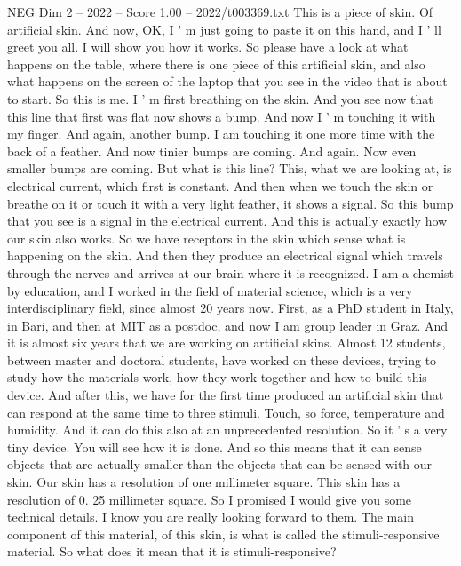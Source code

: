 \begin{textsample}{NEG Dim 2 – 2022 – Score 1.00 – 2022/t003369.txt}  \label{ex:f2_neg_065}
This is a piece of skin.
Of artificial skin.
And now, OK, I ' m just going to paste it on this hand, and I ' ll greet you all.
I will show you how it works.
So please have a look at what happens on the table, where there is one piece of this artificial skin, and also what happens on the screen of the laptop that you see in the video that is about to start.
So this is me.
I ' m first breathing on the skin.
And you see now that this line that first was flat now shows a bump.
And now I ' m touching it with my finger.
And again, another bump.
I am touching it one more time with the back of a feather.
And now tinier bumps are coming.
And again.
Now even smaller bumps are coming.
But what is this line?
This, what we are looking at, is electrical current, which first is constant.
And then when we touch the skin or breathe on it or touch it with a very light feather, it shows a signal.
So this bump that you see is a signal in the electrical current.
And this is actually exactly how our skin also works.
So we have receptors in the skin which sense what is happening on the skin.
And then they produce an electrical signal which travels through the nerves and arrives at our brain where it is recognized.
I am a chemist by education, and I worked in the field of material science, which is a very interdisciplinary field, since almost 20 years now.
First, as a PhD student in Italy, in Bari, and then at MIT as a postdoc, and now I am group leader in Graz.
And it is almost six years that we are working on artificial skins.
Almost 12 students, between master and doctoral students, have worked on these devices, trying to study how the materials work, how they work together and how to build this device.
And after this, we have for the first time produced an artificial skin that can respond at the same time to three stimuli.
Touch, so force, temperature and humidity.
And it can do this also at an unprecedented resolution.
So it ' s a very tiny device.
You will see how it is done.
And so this means that it can sense objects that are actually smaller than the objects that can be sensed with our skin.
Our skin has a resolution of one millimeter square.
This skin has a resolution of 0. 25 millimeter square.
So I promised I would give you some technical details.
I know you are really looking forward to them.
The main component of this material, of this skin, is what is called the stimuli-responsive material.
So what does it mean that it is stimuli-responsive?

\end{textsample}
